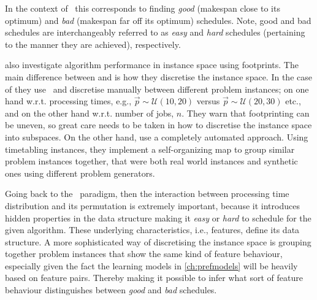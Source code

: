 \clearpage

In the context of \jsp\ this corresponds to finding \emph{good} (makespan close to its optimum)  and \emph{bad} (makespan far off its optimum) schedules. Note, good and bad schedules are interchangeably referred to as \emph{easy} and \emph{hard} schedules (pertaining to the manner they are achieved), respectively. 

\citet{SmithMilesLion5} also investigate algorithm performance in instance space using footprints. The main difference between \citeauthor{Corne10} and \citeauthor{SmithMilesLion5} is how they discretise the instance space. In the case of \citeauthor{Corne10} they use \jsp\ and discretise manually between different problem instances; on one hand w.r.t. processing times, e.g.,  $\vec{p}\sim \mathcal{U}(10,20)$ versus $\vec{p}\sim \mathcal{U}(20,30)$ etc., and on the other hand w.r.t. number of jobs, $n$. 
They warn that footprinting can be uneven, so great care needs to be taken in how to discretise the instance space into subspaces. 
On the other hand, \citeauthor{SmithMilesLion5} use a completely automated approach. Using timetabling instances, they implement a self-organizing map to group similar problem instances together, that were both real world instances and synthetic ones using different problem generators. 

Going back to the \jsp\ paradigm, then the interaction between processing time distribution and its permutation is extremely important, because it introduces hidden properties in the data structure making it \emph{easy} or \emph{hard} to schedule for the given algorithm. These underlying characteristics, i.e., features, define its data structure. A more sophisticated way of discretising the instance space is grouping together problem instances that show the same kind of feature behaviour, especially given the fact the learning models in \cref{ch:prefmodels} will be heavily based on feature pairs. Thereby making it possible to infer what sort of feature behaviour distinguishes  between \emph{good} and \emph{bad} schedules. 

